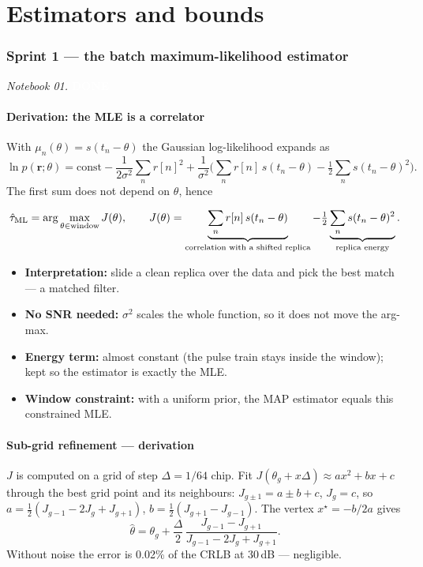 \documentclass[11pt,a4paper]{article}
\newcommand{\done}{\colorbox{okgreen}{\textcolor{white}{\scriptsize\bfseries DONE}}}
\newcommand{\br}{\mathbf{r}}
\begin{document}
\part{Estimators and bounds}
\section{Sprint 1 --- the batch maximum-likelihood estimator}\label{sec:mle}
\textit{Notebook 01.} \done

\subsection{Derivation: the MLE is a correlator}
With $\mu_n(\theta)=s(t_n-\theta)$ the Gaussian log-likelihood expands as
\begin{equation}
\ln p(\br;\theta)=\text{const}-\frac{1}{2\sigma^2}\sum_n r[n]^2+\frac{1}{\sigma^2}\Big(\sum_n r[n]\,s(t_n-\theta)-\tfrac12\sum_n s(t_n-\theta)^2\Big).
\end{equation}
The first sum does not depend on $\theta$, hence
\begin{resultbox}
\begin{equation}
\hat\tau_{\rm ML}=\arg\max_{\theta\in\text{window}}J(\theta),\qquad
J(\theta)=\underbrace{\sum_n r[n]\,s(t_n-\theta)}_{\text{correlation with a shifted replica}}-\tfrac12\underbrace{\sum_n s(t_n-\theta)^2}_{\text{replica energy}}.
\end{equation}
\end{resultbox}
\begin{itemize}
\item \textbf{Interpretation:} slide a clean replica over the data and pick the best match --- a matched filter.
\item \textbf{No SNR needed:} $\sigma^2$ scales the whole function, so it does not move the arg-max.
\item \textbf{Energy term:} almost constant (the pulse train stays inside the window); kept so the estimator is exactly the MLE.
\item \textbf{Window constraint:} with a uniform prior, the MAP estimator equals this constrained MLE.
\end{itemize}

\subsection{Sub-grid refinement --- derivation}
$J$ is computed on a grid of step $\Delta=1/64$ chip. Fit $J(\theta_g+x\Delta)\approx ax^2+bx+c$ through the best grid point
and its neighbours: $J_{g\pm1}=a\pm b+c$, $J_g=c$, so $a=\tfrac12(J_{g-1}-2J_g+J_{g+1})$, $b=\tfrac12(J_{g+1}-J_{g-1})$. The vertex
$x^\star=-b/2a$ gives
\begin{equation}
\hat\theta=\theta_g+\frac{\Delta}{2}\,\frac{J_{g-1}-J_{g+1}}{J_{g-1}-2J_g+J_{g+1}}.
\end{equation}
Without noise the error is 0.02\% of the CRLB at 30\,dB --- negligible.
\end{document}
